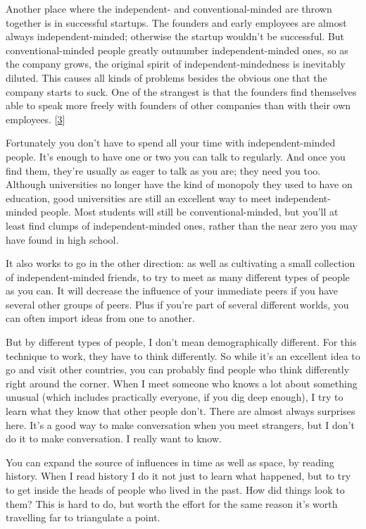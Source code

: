 Another place where the independent- and conventional-minded are thrown
together is in successful startups. The founders and early employees are
almost always independent-minded; otherwise the startup wouldn't be
successful. But conventional-minded people greatly outnumber
independent-minded ones, so as the company grows, the original spirit of
independent-mindedness is inevitably diluted. This causes all kinds of
problems besides the obvious one that the company starts to suck. One of
the strangest is that the founders find themselves able to speak more
freely with founders of other companies than with their own employees.
{[}\hyperref[f3n]{3}{]}

Fortunately you don't have to spend all your time with
independent-minded people. It's enough to have one or two you can talk
to regularly. And once you find them, they're usually as eager to talk
as you are; they need you too. Although universities no longer have the
kind of monopoly they used to have on education, good universities are
still an excellent way to meet independent-minded people. Most students
will still be conventional-minded, but you'll at least find clumps of
independent-minded ones, rather than the near zero you may have found in
high school.

It also works to go in the other direction: as well as cultivating a
small collection of independent-minded friends, to try to meet as many
different types of people as you can. It will decrease the influence of
your immediate peers if you have several other groups of peers. Plus if
you're part of several different worlds, you can often import ideas from
one to another.

But by different types of people, I don't mean demographically
different. For this technique to work, they have to think differently.
So while it's an excellent idea to go and visit other countries, you can
probably find people who think differently right around the corner. When
I meet someone who knows a lot about something unusual (which includes
practically everyone, if you dig deep enough), I try to learn what they
know that other people don't. There are almost always surprises here.
It's a good way to make conversation when you meet strangers, but I
don't do it to make conversation. I really want to know.

You can expand the source of influences in time as well as space, by
reading history. When I read history I do it not just to learn what
happened, but to try to get inside the heads of people who lived in the
past. How did things look to them? This is hard to do, but worth the
effort for the same reason it's worth travelling far to triangulate a
point.

